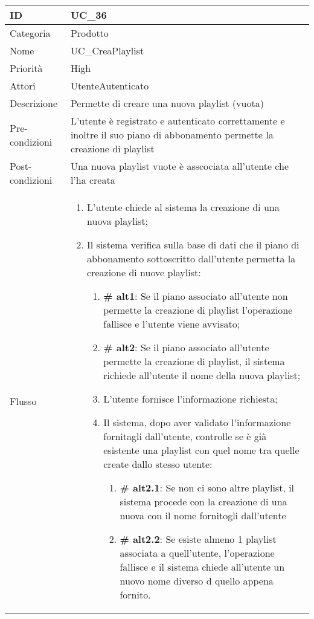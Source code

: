 \begin{center}
\begin{tabular}{ |p{2cm}|p{13cm}|  }
\hline
ID & UC\_36 \\\hline
Categoria & Prodotto \\\hline
Nome & UC\_CreaPlaylist\\\hline
Priorità & High \\\hline
Attori &  UtenteAutenticato \\\hline
Descrizione & Permette di creare una nuova playlist (vuota)\\\hline
Pre-condizioni & L'utente è registrato e autenticato correttamente e inoltre il suo piano di abbonamento permette la creazione di playlist\\\hline
Post-condizioni & Una nuova playlist vuote è asscociata all'utente che l'ha creata\\\hline
Flusso &  	\begin{enumerate}
		\item L'utente chiede al sistema la creazione di una nuova playlist;
		\item Il sistema verifica sulla base di dati che il piano di abbonamento sottoscritto dall'utente permetta la creazione di nuove playlist:
		 \begin{enumerate}[label*=\arabic*.]
			\item \textbf{\# alt1}: Se il piano associato all'utente non permette la creazione di playlist l'operazione fallisce e l'utente viene avvisato;
			\item \textbf{\# alt2}: Se il piano associato all'utente permette la creazione di playlist, il sistema richiede all'utente il nome della nuova playlist;
			\item L'utente fornisce l'informazione richiesta;
			\item Il sistema, dopo aver validato l'informazione fornitagli dall'utente, controlle se è già esistente una playlist con quel nome tra quelle create dallo stesso utente:
			\begin{enumerate}[label*=\arabic*.]
				\item \textbf{\# alt2.1}: Se non ci sono altre playlist, il sistema procede con la creazione di una nuova con il nome fornitogli dall'utente
				\item \textbf{\# alt2.2}: Se esiste almeno 1 playlist associata a quell'utente, l'operazione fallisce e il sistema chiede all'utente un nuovo nome diverso d quello appena fornito.
			\end{enumerate}
		\end{enumerate}
		\end{enumerate}\\\hline
\end{tabular}
\label{table_use_case:36}\newline


\end{center}
